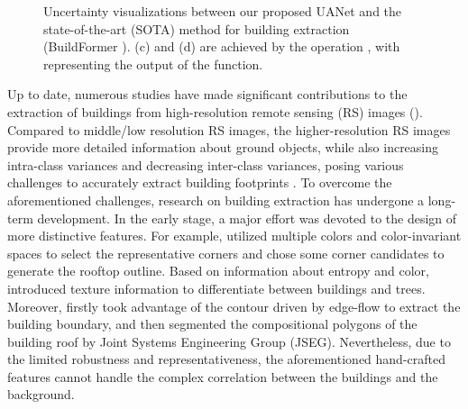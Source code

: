 \documentclass[lettersize,journal]{IEEEtran}
\begin{document}
\begin{figure}[t]
\vspace{-2.0em}
\centering
{}
\hfil
{}
\hfil
{}

\caption{Uncertainty visualizations between our proposed UANet and the state-of-the-art (SOTA) method for building extraction (BuildFormer \cite{BuildFormer}). (c) and (d) are achieved by the operation , with  representing the output of the  function.}
\vspace{-2.em}
\label{fig_1}
\end{figure}
\par
Up to date, numerous studies have made significant contributions to the extraction of buildings from high-resolution remote sensing (RS) images (\cite{DSNet,BuildFormer,MA_FCN}). Compared to middle/low resolution RS images, the higher-resolution RS images provide more detailed information about ground objects, while also increasing intra-class variances and decreasing inter-class variances, posing various challenges to accurately extract building footprints \cite{variance_inter_intra}.
To overcome the aforementioned challenges, research on building extraction has undergone a long-term development. In the early stage, a major effort was devoted to the design of more distinctive features. For example, \cite{color} utilized multiple colors and color-invariant spaces to select the representative corners and chose some corner candidates to generate the rooftop outline. Based on information about entropy and color, \cite{texture} introduced texture information to differentiate between buildings and trees. Moreover, \cite{contour} firstly took advantage of the contour driven by edge-flow to extract the building boundary, and then segmented the compositional polygons of the building roof by Joint Systems Engineering Group (JSEG). Nevertheless, due to the limited robustness and representativeness, the aforementioned hand-crafted features cannot handle the complex correlation between the buildings and the background.
\end{document}
